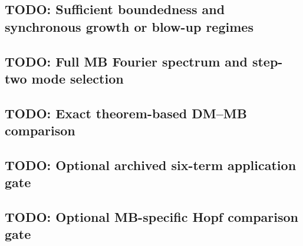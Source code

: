 \subsection{TODO: Sufficient boundedness and synchronous growth or blow-up regimes}
\label{slot:P08-3}

\subsection{TODO: Full MB Fourier spectrum and step-two mode selection}
\label{slot:P08-4}

\subsection{TODO: Exact theorem-based DM--MB comparison}
\label{slot:P08-5}

\subsection{TODO: Optional archived six-term application gate}
\label{slot:P08-6}

\subsection{TODO: Optional MB-specific Hopf comparison gate}
\label{slot:P08-extra-1}
